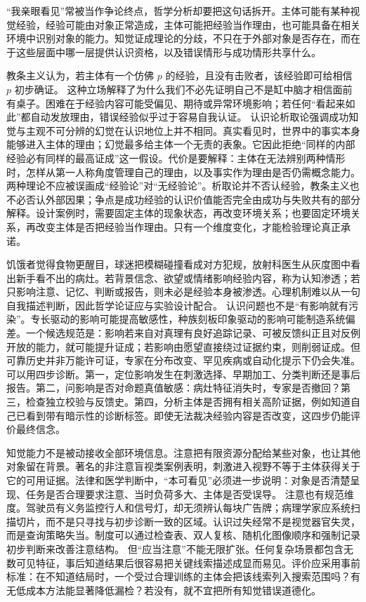 “我亲眼看见”常被当作争论终点，哲学分析却要把这句话拆开。主体可能有某种视觉经验，经验可能由对象正常造成，主体可能把经验当作理由，也可能具备在相关环境中识别对象的能力。知觉证成理论的分歧，不只在于外部对象是否存在，而在于这些层面中哪一层提供认识资格，以及错误情形与成功情形共享什么。

教条主义认为，若主体有一个仿佛 \(p\) 的经验，且没有击败者，该经验即可给相信 \(p\) 初步确证。\parencite{pryor2000} 这种立场解释了为什么我们不必先证明自己不是缸中脑才相信面前有桌子。困难在于经验内容可能受偏见、期待或异常环境影响；若任何“看起来如此”都自动发放理由，错误经验似乎过于容易自我认证。 认识论析取论强调成功知觉与主观不可分辨的幻觉在认识地位上并不相同。真实看见时，世界中的事实本身能够进入主体的理由；幻觉最多给主体一个无责的表象。它因此拒绝“同样的内部经验必有同样的最高证成”这一假设。代价是要解释：主体在无法辨别两种情形时，怎样从第一人称角度管理自己的理由，以及事实作为理由是否仍需概念能力。 两种理论不应被误画成“经验论”对“无经验论”。析取论并不否认经验，教条主义也不必否认外部因果；争点是成功经验的认识价值能否完全由成功与失败共有的部分解释。设计案例时，需要固定主体的现象状态，再改变环境关系；也要固定环境关系，再改变主体是否把经验当作理由。只有一个维度变化，才能检验理论真正承诺。

饥饿者觉得食物更醒目，球迷把模糊碰撞看成对方犯规，放射科医生从灰度图中看出新手看不出的病灶。若背景信念、欲望或情绪影响经验内容，称为认知渗透；若只影响注意、记忆、判断或报告，则未必是经验本身被渗透。心理机制难以从一句自我描述判断，因此哲学论证应与实验设计配合。 认识问题也不是“有影响就有污染”。专长驱动的影响可能提高敏感性，种族刻板印象驱动的影响可能制造系统偏差。一个候选规范是：影响若来自对真理有良好追踪记录、可被反馈纠正且对反例开放的能力，就可能提升证成；若影响由愿望直接绕过证据约束，则削弱证成。但可靠历史并非万能许可证，专家在分布改变、罕见疾病或自动化提示下仍会失准。 可以用四步诊断。第一，定位影响发生在刺激选择、早期加工、分类判断还是事后报告。第二，问影响是否对命题真值敏感：病灶特征消失时，专家是否撤回？第三，检查独立校验与反馈史。第四，分析主体是否拥有相关高阶证据，例如知道自己已看到带有暗示性的诊断标签。即使无法裁决经验内容是否改变，这四步仍能评价最终信念。

知觉能力不是被动接收全部环境信息。注意把有限资源分配给某些对象，也让其他对象留在背景。著名的非注意盲视类案例表明，刺激进入视野不等于主体获得关于它的可用证据。法律和医学判断中，“本可看见”必须进一步说明：对象是否清楚呈现、任务是否合理要求注意、当时负荷多大、主体是否受误导。 注意也有规范维度。驾驶员有义务监控行人和信号灯，却无须辨认每块广告牌；病理学家应系统扫描切片，而不是只寻找与初步诊断一致的区域。认识过失经常不是视觉器官失灵，而是查询策略失当。制度可以通过检查表、双人复核、随机化图像顺序和强制记录初步判断来改善注意结构。 但“应当注意”不能无限扩张。任何复杂场景都包含无数可见特征，事后知道结果后很容易把关键线索描述成显而易见。评价应采用事前标准：在不知道结局时，一个受过合理训练的主体会把该线索列入搜索范围吗？有无低成本方法能显著降低漏检？若没有，就不宜把所有知觉错误道德化。

